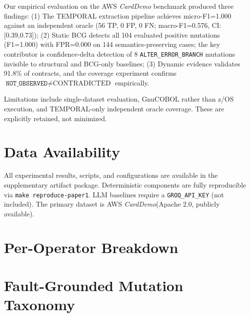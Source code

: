 \documentclass[sigconf,anonymous,review]{acmart}
\newcommand{\bcg}{\textsc{BCG}\xspace}
\newcommand{\carddemo}{\textit{CardDemo}\xspace}
\newcommand{\notobs}{\texttt{NOT\_OBSERVED}\xspace}
\begin{document}
Our empirical evaluation on the AWS \carddemo benchmark produced three findings:
(1) The TEMPORAL extraction pipeline achieves micro-F1=1.000 against an independent
oracle (56 TP, 0 FP, 0 FN; macro-F1=0.576, CI:[0.39,0.73]);
(2) Static \bcg detects all 104 evaluated positive mutations (F1=1.000) with
FPR=0.000 on 144 semantics-preserving cases; the key contributor is confidence-delta
detection of 8 \texttt{ALTER\_ERROR\_BRANCH} mutations invisible to structural and
BCG-only baselines;
(3) Dynamic evidence validates 91.8\% of contracts, and the coverage experiment
confirms $\notobs \neq \text{CONTRADICTED}$ empirically.

Limitations include single-dataset evaluation, GnuCOBOL rather than z/OS execution,
and TEMPORAL-only independent oracle coverage.
These are explicitly retained, not minimized.

\section*{Data Availability}\label{sec:data}

All experimental results, scripts, and configurations are available in the
supplementary artifact package.
Deterministic components are fully reproducible via \texttt{make reproduce-paper1}.
LLM baselines require a \texttt{GROQ\_API\_KEY} (not included).
The primary dataset is AWS \carddemo (Apache 2.0, publicly available).




\appendix
\section{Per-Operator Breakdown}\label{app:per_operator}



\section{Fault-Grounded Mutation Taxonomy}\label{app:mutations}


\end{document}
